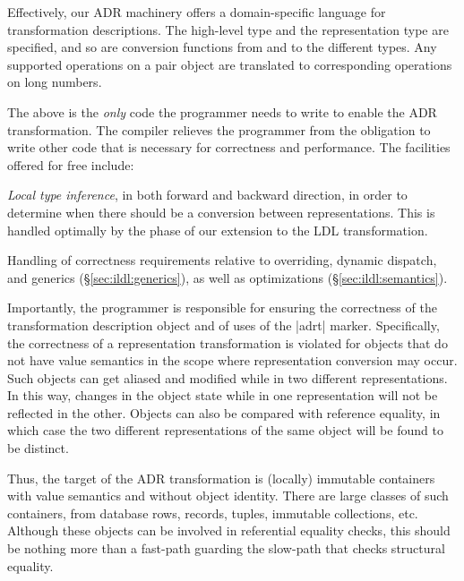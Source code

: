 Effectively, our ADR machinery offers a domain-specific language for
transformation descriptions. The high-level type and the
representation type are specified, and so are conversion functions from
and to the different types. Any supported operations on a pair object
are translated to corresponding operations on long numbers.

The above is the \emph{only} code the programmer needs to write to
enable the ADR transformation. The compiler relieves the programmer
from the obligation to write other code that is necessary for
correctness and performance. The facilities offered for free include:

\begin{compactitem}
\item \emph{Local type inference}, in both forward and
  backward direction, in order to determine when there should be a
  conversion between representations. This is handled optimally by the
  \coerce{} phase of our extension to the LDL transformation.

\item Handling of correctness requirements relative to overriding,
  dynamic dispatch, and generics (\S\ref{sec:ildl:generics}), as
  well as optimizations (\S\ref{sec:ildl:semantics}).
\end{compactitem}

Importantly, the programmer is responsible for ensuring the
correctness of the transformation description object and of uses of
the |adrt| marker. Specifically, the correctness of a representation
transformation is violated for objects that do not have value
semantics in the scope where representation conversion may occur. Such
objects can get aliased and modified while in two different
representations.  In this way, changes in the object state while in
one representation will not be reflected in the other. Objects can
also be compared with reference equality, in which case the two
different representations of the same object will be found to be
distinct.

Thus, the target of the ADR transformation is (locally) immutable
containers with value semantics and without object identity. There are
large classes of such containers, from database rows, records, tuples,
immutable collections, etc. Although these objects can be involved in
referential equality checks, this should be nothing more than a
fast-path guarding the slow-path that checks structural equality.

